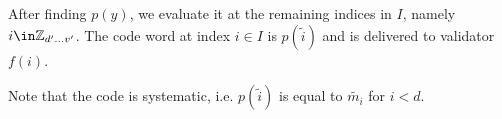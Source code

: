 After finding $p(y)$, we evaluate it at the remaining indices in $I$, namely $i \in \Z\interval{d'}{v'}$. The code word at index $i \in I$ is $p(\tilde{i})$ and is delivered to validator $f(i)$.

Note that the code is systematic, i.e. $p(\tilde{i})$ is equal to $\widetilde{m_i}$ for $i < d$.







